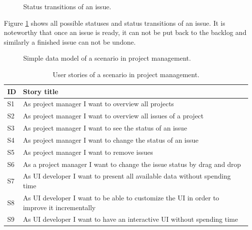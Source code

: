 \begin{figure}[!htb]
  \caption{Status transitions of an issue.}
  \label{fig:statetransition}
\end{figure}

Figure \ref{fig:statetransition} shows all possible statuses and status transitions of an issue. It is noteworthy that once an issue is ready, it can not be put back to the backlog and similarly a finished issue can not be undone.

\begin{figure}[!htb]
  \caption{Simple data model of a scenario in project management.}
\end{figure}

\begin{table}[!htb]
  \begin{center}
    \begin{tabular}{ |l|l| }
      \hline
      \textbf{ID} & \textbf{Story title} \\
      \hline
      S1 & As project manager I want to overview all projects \\
      \hline
      S2 & As project manager I want to overview all issues of a project \\
      \hline
      S3 & As project manager I want to see the status of an issue \\
      \hline
      S4 & As project manager I want to change the status of an issue \\
      \hline
      S5 & As project manager I want to remove issues \\
      \hline
      S6 & As a project manager I want to change the issue status by drag and drop \\
      \hline
      S7 & As UI developer I want to present all available data without spending time \\
      \hline
      S8 & As UI developer I want to be able to customize the UI in order to improve it incrementally \\
      \hline
      S9 & As UI developer I want to have an interactive UI without spending time \\
      \hline
    \end{tabular}
    \caption{User stories of a scenario in project management.}
    \label{tab:usecase2}
  \end{center}
\end{table}

